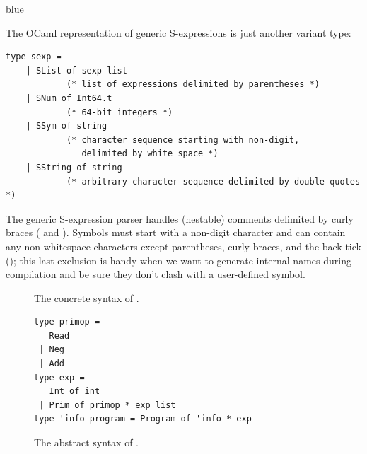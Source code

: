 \documentclass[11pt]{book}
\newenvironment{ocamlx}{
  \begin{color}{blue}
}
{
  \end{color}
}
\begin{document}
\begin{ocamlx}
  The OCaml representation of generic S-expressions is just another
  variant type:
  \begin{lstlisting}[style=ocaml]
    type sexp =
    | SList of sexp list
            (* list of expressions delimited by parentheses *)
    | SNum of Int64.t
            (* 64-bit integers *)
    | SSym of string
            (* character sequence starting with non-digit,
               delimited by white space *)
    | SString of string
            (* arbitrary character sequence delimited by double quotes *)
  \end{lstlisting}
  The generic S-expression parser handles (nestable) comments delimited by
  curly braces (\code{\{} and \code{\}}).  Symbols must start with a non-digit
  character and can contain any
  non-whitespace characters except parentheses, curly braces, and
  the back tick (\code{\`}); this last exclusion is handy when we want to
  generate internal names during compilation and be sure they don't clash
  with a user-defined symbol.
\end{ocamlx}
  
\begin{figure}[tp]
\caption{The concrete syntax of \LangInt{}.}
\label{fig:r0-concrete-syntax}
\end{figure}

\begin{figure}[tp]

\begin{minipage}{0.96\textwidth}
\begin{lstlisting}[style=ocaml,frame=single]
type primop = 
   Read
 | Neg
 | Add
type exp = 
   Int of int  
 | Prim of primop * exp list
type 'info program = Program of 'info * exp
\end{lstlisting}
\end{minipage}
\caption{The abstract syntax of \LangInt{}.}
\label{fig:r0-syntax}
\end{figure}
\end{document}

